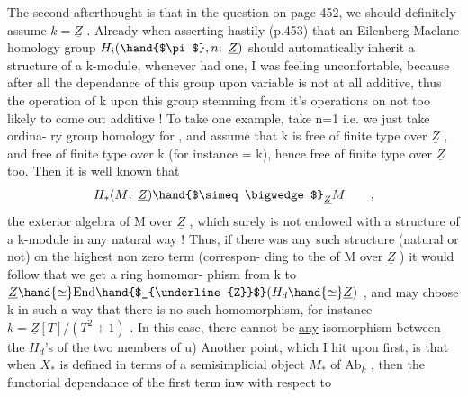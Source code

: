 The second afterthought is  that in the question on page 452,  we
should definitely assume $k=\underline{Z}$ .  Already when asserting hastily (p.453)
that an Eilenberg-Maclane homology group $H_i(\hand{$\pi$},n;\ \underline{Z})$  should automatically
inherit a structure of a k-module,  whenever \hand{$\pi$} had one,  I was feeling
unconfortable,  because after all the dependance of this group upon
variable \hand{$\pi$} is not at all additive,  thus the operation of k upon this
group stemming from it's operations on \hand{$\pi$}   not too likely to come
out additive !  To take one example,  take n=1 i.e. we just take ordina-%
ry group homology for \hand{$\pi$} ,  and assume that k is free of finite type over
$\underline{Z}$ ,  and \hand{$\pi$} free of finite type over k (for instance = k),  hence free
of finite type over $\underline{Z}$ too.  Then it is well known that
\[ H_*(M;\ \underline{Z})\hand{$\simeq \bigwedge$}_{\underline{Z}}M \qquad , \]
the exterior algebra of M  over $\underline{Z}$ ,  which surely is not endowed with a
structure of a k-module in any natural way !  Thus,  if there was any
such structure (natural or not) on the highest non zero term (correspon-%
ding to the  of M over $\underline{Z}$ )\hand{,} it would follow that we get a ring homomor-%
phism  from  k to  $\underline{Z}\hand{\simeq} \mathrm{End}\hand{$_{\underline{Z}}$}(H_d\hand{\simeq} \underline{Z})$ ,  and  may choose k in such a
way that there is no such homomorphism,  for instance  $k = \underline{Z}[T]/(T^2+1)$ .
In this case,  there cannot be \uline{any} isomorphism  between the $H_d$'s of the
two members of \hand{(}u)  Another point,  which I hit upon first,  is that
when  $X_*$  is defined in terms of a semisimplicial object $M_*$ of $\mathrm{Ab}_k$ ,
then the functorial dependance of the first term in\hand{(}w\hand{)} with respect to

